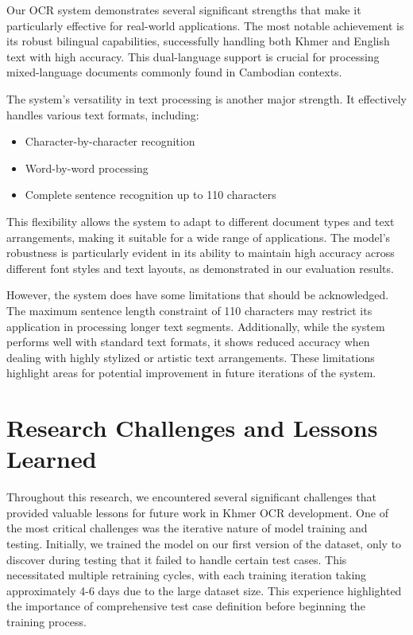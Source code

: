Our OCR system demonstrates several significant strengths that make it particularly effective for real-world 
applications. The most notable achievement is its robust bilingual capabilities, successfully handling both Khmer 
and English text with high accuracy. This dual-language support is crucial for processing mixed-language documents 
commonly found in Cambodian contexts.

The system's versatility in text processing is another major strength. It effectively handles various text formats, including:
\begin{itemize}
    \item Character-by-character recognition
    \item Word-by-word processing
    \item Complete sentence recognition up to 110 characters
\end{itemize}

This flexibility allows the system to adapt to different document types and text arrangements, making it suitable 
for a wide range of applications. The model's robustness is particularly evident in its ability to maintain high 
accuracy across different font styles and text layouts, as demonstrated in our evaluation results.

However, the system does have some limitations that should be acknowledged. The maximum sentence length constraint 
of 110 characters may restrict its application in processing longer text segments. Additionally, while the system 
performs well with standard text formats, it shows reduced accuracy when dealing with highly stylized or artistic 
text arrangements. These limitations highlight areas for potential improvement in future iterations of the system.


\section{Research Challenges and Lessons Learned}
\label{sec:challenges}

Throughout this research, we encountered several significant challenges that provided valuable lessons 
for future work in Khmer OCR development. One of the most critical challenges was the iterative nature of 
model training and testing. Initially, we trained the model on our first version of the dataset, only to 
discover during testing that it failed to handle certain test cases. This necessitated multiple retraining cycles, 
with each training iteration taking approximately 4-6 days due to the large dataset size. This experience 
highlighted the importance of comprehensive test case definition before beginning the training process.

